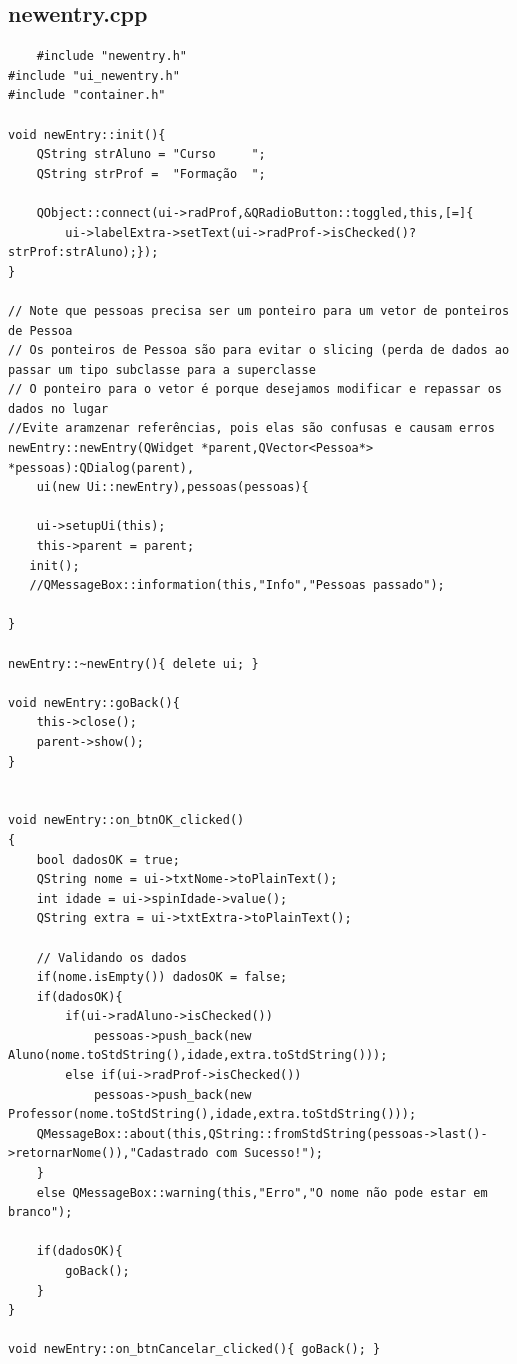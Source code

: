 \documentclass[12pt,a4paper]{article}
\begin{document}
\subsection*{newentry.cpp}
\begin{verbatim}
	#include "newentry.h"
#include "ui_newentry.h"
#include "container.h"

void newEntry::init(){
    QString strAluno = "Curso     ";
    QString strProf =  "Formação  ";

    QObject::connect(ui->radProf,&QRadioButton::toggled,this,[=]{
        ui->labelExtra->setText(ui->radProf->isChecked()?strProf:strAluno);});
}

// Note que pessoas precisa ser um ponteiro para um vetor de ponteiros de Pessoa
// Os ponteiros de Pessoa são para evitar o slicing (perda de dados ao passar um tipo subclasse para a superclasse
// O ponteiro para o vetor é porque desejamos modificar e repassar os dados no lugar
//Evite aramzenar referências, pois elas são confusas e causam erros
newEntry::newEntry(QWidget *parent,QVector<Pessoa*> *pessoas):QDialog(parent),
    ui(new Ui::newEntry),pessoas(pessoas){

    ui->setupUi(this);
    this->parent = parent;
   init();
   //QMessageBox::information(this,"Info","Pessoas passado");

}

newEntry::~newEntry(){ delete ui; }

void newEntry::goBack(){
    this->close();
    parent->show();
}


void newEntry::on_btnOK_clicked()
{
    bool dadosOK = true;
    QString nome = ui->txtNome->toPlainText();
    int idade = ui->spinIdade->value();
    QString extra = ui->txtExtra->toPlainText();

    // Validando os dados
    if(nome.isEmpty()) dadosOK = false;
    if(dadosOK){
        if(ui->radAluno->isChecked())
            pessoas->push_back(new Aluno(nome.toStdString(),idade,extra.toStdString()));
        else if(ui->radProf->isChecked())
            pessoas->push_back(new Professor(nome.toStdString(),idade,extra.toStdString()));
    QMessageBox::about(this,QString::fromStdString(pessoas->last()->retornarNome()),"Cadastrado com Sucesso!");
    }
    else QMessageBox::warning(this,"Erro","O nome não pode estar em branco");

    if(dadosOK){
        goBack();
    }
}

void newEntry::on_btnCancelar_clicked(){ goBack(); }
\end{verbatim}
\end{document}
